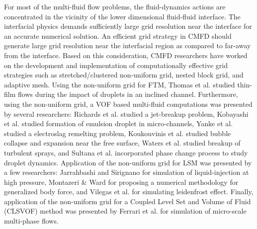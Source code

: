 \documentclass[preprint,12pt]{elsarticle}
\begin{document}
For most of the multi-fluid flow problems, the fluid-dynamics actions
are concentrated in the vicinity of the lower dimensional fluid-fluid
interface. The interfacial physics demands sufficiently large grid
resolution near the interface for an accurate numerical solution.
An efficient grid strategy in CMFD should generate large grid resolution
near the interfacial region as compared to far-away  from the interface.
Based on this consideration, CMFD researchers have worked on the development
and implementation of computationally effective grid strategies such
as stretched/clustered non-uniform grid, nested block grid, and adaptive
mesh. Using the non-uniform grid for FTM, Thomas et al. \cite{thomas2010}
studied thin-film flows during the impact of droplets in an inclined
channel. Furthermore, using the non-uniform grid, a VOF based multi-fluid
computations was presented by several researchers: Richards et al.
\cite{richards1995} studied a jet-breakup problem, Kobayashi et al. \cite{kobayashi2004}
studied formation of emulsion droplet in micro-channels, Yanke et
al. \cite{Yanke2015} studied a electroslag remelting problem,  Koukouvinis
et al. \cite{koukouvinis2016} studied bubble collapse and expansion near
the free surface, Waters et al. \cite{waters2017} studied breakup of
turbulent sprays,  and Sultana et al. \cite{sultana2017} incorporated
phase change process to study  droplet dynamics.   Application of
the non-uniform grid for LSM was presented by a few researchers: Jarrahbashi and Sirignano
\cite{Jarrahbashi2014} for simulation of liquid-injection at high pressure,
Montazeri \& Ward \cite{Montezari2014} for proposing a numerical methodology
for generalized body force, and Vilegas et al. \cite{villegas2016,villegas2017}
for simulating leidenfrost effect. Finally, application of the non-uniform
grid for a Coupled Level Set and Volume of Fluid (CLSVOF) method was
presented by Ferrari et al. \cite{ferrari2017} for simulation of micro-scale
multi-phase flows.
\end{document}

